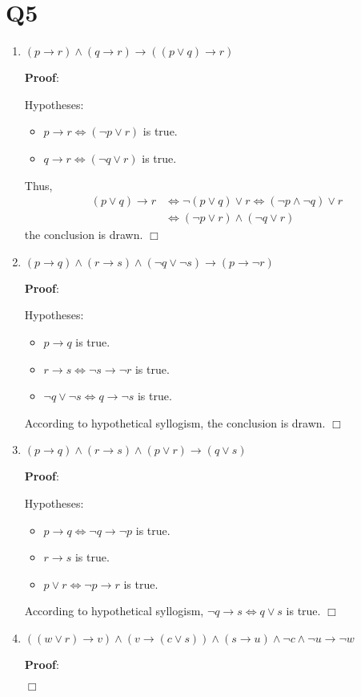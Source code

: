 \documentclass[11pt]{article}
\newenvironment{qparts}{\begin{enumerate}[{(}a{)}]}{\end{enumerate}}
\def\endproofmark{$\Box$}
\newenvironment{proof}{\par{\bf Proof}:}{\endproofmark\smallskip}
\begin{document}
\section*{Q5}
\begin{qparts}
    
    \item $(p\to r)\land (q \to r)\to ((p \lor q)\to r)$
    \begin{proof}

        Hypotheses: 
        \begin{itemize}
            \item $p \to r \iff (\lnot p \lor r)$ is true.
            \item $q \to r \iff(\lnot q \lor r)$ is true.
        \end{itemize}
        Thus, 
        \begin{align*}
            (p \lor q) \to r &\iff\lnot (p \lor q) \lor r 
            \iff (\lnot p \land \lnot q)\lor r \\
            &\iff (\lnot p \lor r) \land (\lnot q \lor r)
        \end{align*}
        the conclusion is drawn.
    \end{proof}
    
    \item $(p \to q)\land (r \to s )\land (\lnot q\lor \lnot s) \to (p \to \lnot r)$
    \begin{proof}
        
        Hypotheses:
        \begin{itemize}
            \item $p \to q$ is true.
            \item $r \to s \iff \lnot s \to \lnot r$ is true.
            \item $\lnot q \lor \lnot s \iff q \to \lnot s$ is true.
        \end{itemize}
        According to hypothetical syllogism, the conclusion is drawn.
    \end{proof}
    
    \item $(p \to q)\land (r \to s) \land (p \lor r)\to (q \lor s)$
    \begin{proof}

        Hypotheses:
        \begin{itemize}
            
            \item $p \to q \iff \lnot q \to \lnot p$ is true.
            \item $r \to s$ is true.
            \item $p \lor r \iff \lnot p \to r$ is true.
        \end{itemize}
        According to hypothetical syllogism, 
        $\lnot q \to s \iff q \lor s$ is true.
    \end{proof}
    \item $((w \lor r)\to v) 
    \land (v \to (c \lor s))
    \land (s \to u)
    \land \lnot c 
    \land \lnot u
    \to \lnot w$
    \begin{proof}
        

\end{proof}
\end{qparts}
\end{document}

